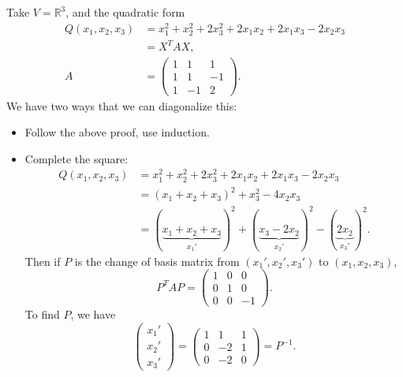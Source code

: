 \documentclass[12pt]{article}
\begin{document}
\begin{exbox}
	Take $V = \mathbb{R}^3$, and the quadratic form
	 \begin{align*}
		 Q(x_1, x_2, x_3) &= x_1^2 + x_2^2 + 2x_3^2 + 2x_1 x_2 + 2x_1 x_3 - 2x_2 x_3 \\
				  &= X^{T}AX, \\
		 A &=
		 \begin{pmatrix}
			 1 & 1 & 1 \\
			 1 & 1 & -1 \\
			 1 & -1 & 2
		 \end{pmatrix}.
	\end{align*}
	We have two ways that we can diagonalize this:
	\begin{itemize}
		\item Follow the above proof, use induction.
		\item Complete the square:
			\begin{align*}
				Q(x_1, x_2, x_3) &= x_1^2 + x_2^2 + 2x_3^2 + 2x_1x_2 + 2x_1x_3 - 2x_2 x_3 \\
						 &= (x_1 + x_2 + x_3)^2 + x_3^2 - 4x_2 x_3 \\
						 &= (\underbrace{x_1 + x_2 + x_3}_{x_1'})^2 + (\underbrace{x_3 - 2x_2}_{x_2'})^2 - (\underbrace{2x_2}_{x_3'})^2.
			\end{align*}
			Then if $P$ is the change of basis matrix from $(x_1', x_2', x_3')$ to $(x_1, x_2, x_3)$,
			\[
			P^{T}AP =
			\begin{pmatrix}
				1 & 0 & 0 \\
				0 & 1 & 0 \\
				0 & 0 & -1
			\end{pmatrix}
			.\]
			To find $P$, we have
			\[
				\begin{pmatrix}
					x_1' \\
					x_2' \\
					x_3'
				\end{pmatrix}
				=
				\begin{pmatrix}
					1 & 1 & 1 \\
					0 & -2 & 1 \\
					0 & -2 & 0
				\end{pmatrix}
				= P^{-1}
			.\]
	\end{itemize}
\end{exbox}


\newpage

\printindex
\end{document}
